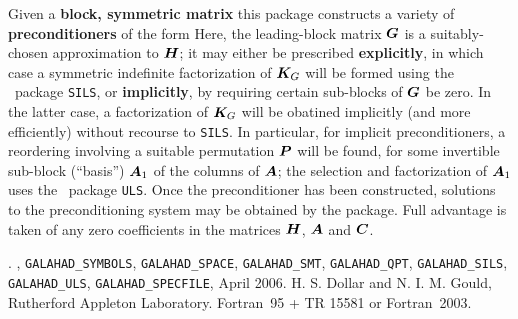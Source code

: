 \documentclass{galahad}
\newcommand{\packagename}{SBLS}
\newcommand{\fullpackagename}{\libraryname\_\packagename}
\begin{document}
\galheader


\galsummary
Given a {\bf block, symmetric matrix}
this package constructs a variety of {\bf preconditioners} of the form
Here, the leading-block matrix ${\bm{G}}$ is a suitably-chosen 
approximation to ${\bm{H}}$; it may either be prescribed {\bf explicitly}, in 
which case a symmetric indefinite factorization of ${\bm{K}}_{G}$
will be formed using the \galahad\ package {\tt SILS}, 
or {\bf implicitly}, by requiring certain sub-blocks of ${\bm{G}}$ 
be zero. In the latter case, a factorization of ${\bm{K}}_{G}$ will be
obatined implicitly (and more efficiently) without recourse to {\tt SILS}. 
In particular, for implicit preconditioners, a reordering 
involving a suitable permutation ${\bm{P}}$ will be found, for some
invertible sub-block (``basis'') ${\bm{A}}_1$ of the columns of ${\bm{A}}$;
the selection and factorization of ${\bm{A}}_1$ uses
the \galahad\ package {\tt ULS}.
Once the preconditioner has been constructed, 
solutions to the preconditioning system
may be obtained by the package.
Full advantage is taken of any zero coefficients in the matrices ${\bm{H}}$,
${\bm{A}}$ and ${\bm{C}}$.


\galattributes
\galversions{\tt  \fullpackagename\_single, \fullpackagename\_double}.
,
{\tt GALAHAD\_SY\-M\-BOLS}, 
{\tt GALAHAD\-\_SPACE}, 
{\tt GALAHAD\_SMT},
{\tt GALAHAD\_QPT},
{\tt GALAHAD\_SILS},
{\tt GALAHAD\_ULS}, 
{\tt GALAHAD\_SPECFILE},
\galdate April 2006.
\galorigin \linebreak H. S. Dollar and N. I. M. Gould,
Rutherford Appleton Laboratory.
\gallanguage Fortran~95 + TR 15581 or Fortran~2003. 

\end{document}
